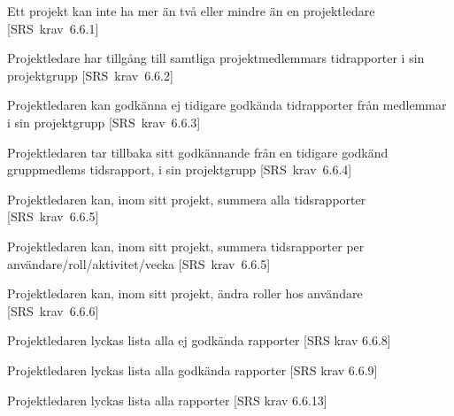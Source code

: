 \documentclass[a4paper]{article}
\begin{document}
\begin{appendices}
\begin{FT}
\item
Ett projekt kan inte ha mer än två eller mindre än en projektledare [SRS~krav~6.6.1]

\item
Projektledare har tillgång till samtliga projektmedlemmars tidrapporter i sin projektgrupp [SRS~krav~6.6.2]

\item
Projektledaren kan godkänna ej tidigare godkända tidrapporter från medlemmar i sin projektgrupp [SRS~krav~6.6.3]

\item
Projektledaren tar tillbaka sitt godkännande från en tidigare godkänd gruppmedlems tidsrapport, i sin projektgrupp [SRS~krav~6.6.4]

\item
Projektledaren kan, inom sitt projekt, summera alla tidsrapporter [SRS~krav~6.6.5]

\item
Projektledaren kan, inom sitt projekt, summera tidsrapporter per användare/roll/aktivitet/vecka [SRS~krav~6.6.5]

\item
Projektledaren kan, inom sitt projekt, ändra roller hos användare [SRS~krav~6.6.6]



\item
Projektledaren lyckas lista alla ej godkända rapporter [SRS krav 6.6.8]

\item
Projektledaren lyckas lista alla godkända rapporter [SRS krav 6.6.9]

\item
Projektledaren lyckas lista alla rapporter [SRS krav 6.6.13]






\end{FT}
\end{appendices}



\newpage
\end{document}
